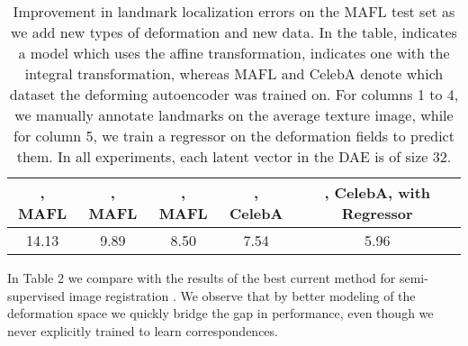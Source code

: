 \documentclass[runningheads]{llncs}
\begin{document}



\begin{table}[ht!]
 \centering
 \begin{tabular}{c | c | c | c | c }
      , MAFL & , MAFL & , MAFL & , CelebA & , CelebA, with Regressor  \\
      \hline
      14.13 & 9.89 & 8.50 & 7.54 & 5.96\\
      \hline
 \end{tabular}
 \caption{Improvement in landmark localization errors on the MAFL test set as we add new types of deformation and new data. In the table,  indicates a model which uses the affine transformation,  indicates one with the integral transformation, whereas MAFL and CelebA denote which dataset the deforming autoencoder was trained on.  For columns 1 to 4, we manually annotate landmarks on the average texture image, while for column 5, we train a regressor on the deformation fields to predict them. In all experiments, each latent vector in the DAE is of size 32.}
 \label{tab:errDeforms}
 \vspace{-.5cm}
\end{table}



In Table 2 we compare with the results of the best current method for semi-supervised image registration \cite{ThewlisBV17a}. We observe that by better modeling of the deformation space we quickly bridge the gap in performance, even though we never explicitly trained to learn correspondences.
\end{document}
